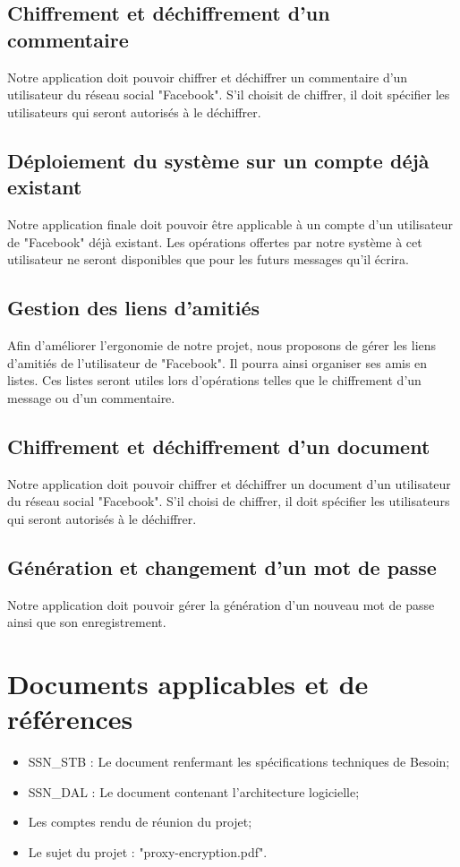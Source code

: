 \documentclass[a4paper,11pt,french]{article}
\begin{document}
\subsection*{Chiffrement et déchiffrement d'un commentaire}
Notre application doit pouvoir chiffrer et déchiffrer un commentaire d'un
utilisateur du réseau social "Facebook". S'il choisit de chiffrer, il doit
spécifier les utilisateurs qui seront autorisés à le déchiffrer.

\subsection*{Déploiement du système sur un compte déjà existant}
Notre application finale doit pouvoir être applicable à un compte d'un
utilisateur de "Facebook" déjà existant. Les opérations offertes par notre
système à cet utilisateur ne seront disponibles que pour les futurs messages
qu'il écrira.

\subsection*{Gestion des liens d'amitiés}
Afin d'améliorer l'ergonomie de notre projet, nous proposons de gérer les
liens d'amitiés de l'utilisateur de "Facebook". Il pourra ainsi organiser
ses amis en listes. Ces listes seront utiles lors d'opérations telles que
le chiffrement d'un message ou d'un commentaire.

\subsection*{Chiffrement et déchiffrement d'un document}
Notre application doit pouvoir chiffrer et déchiffrer un document d'un
utilisateur du réseau social "Facebook". S'il choisi de chiffrer, il
doit spécifier les utilisateurs qui seront autorisés à le déchiffrer.

\subsection*{Génération et changement d'un mot de passe}
Notre application doit pouvoir gérer la génération d'un nouveau mot de passe
ainsi que son enregistrement.

\newpage

\section{Documents applicables et de références}
\begin{itemize}
	\item SSN\_STB : Le document renfermant les spécifications techniques de Besoin;
	\item SSN\_DAL : Le document contenant l'architecture logicielle;
	\item Les comptes rendu de réunion du projet;
	\item Le sujet du projet : "proxy-encryption.pdf".
\end{itemize}
\end{document}
